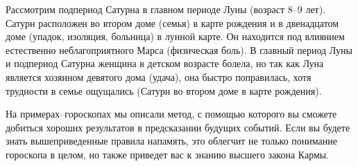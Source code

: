 Рассмотрим подпериод Сатурна в главном периоде Луны (возраст 8--9 лет). Сатурн расположен во втором доме (семья) в карте рождения и в двенадцатом доме (упадок, изоляция, больница) в лунной карте. Он находится под влиянием естественно неблагоприятного Марса (физическая боль). В главный период Луны и подпериод Сатурна женщина в детском возрасте болела, но так как Луна является хозяином девятого дома (удача), она быстро поправилась, хотя трудности в семье ощущались (Сатурн во втором доме в карте рождения).

На примерах--гороскопах мы описали метод, с помощью которого вы сможете добиться хороших результатов в предсказании будущих событий. Если вы будете знать вышеприведенные правила напамять, это облегчит не только понимание гороскопа в целом, но также приведет вас к знанию высшего закона Кармы.
